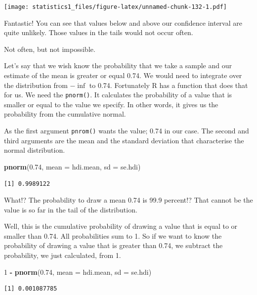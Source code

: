 \documentclass[]{book}
\newenvironment{Shaded}{\begin{snugshade}}{\end{snugshade}}
\newcommand{\KeywordTok}[1]{\textcolor[rgb]{0.13,0.29,0.53}{\textbf{#1}}}
\newcommand{\DataTypeTok}[1]{\textcolor[rgb]{0.13,0.29,0.53}{#1}}
\newcommand{\DecValTok}[1]{\textcolor[rgb]{0.00,0.00,0.81}{#1}}
\newcommand{\FloatTok}[1]{\textcolor[rgb]{0.00,0.00,0.81}{#1}}
\newcommand{\StringTok}[1]{\textcolor[rgb]{0.31,0.60,0.02}{#1}}
\newcommand{\OperatorTok}[1]{\textcolor[rgb]{0.81,0.36,0.00}{\textbf{#1}}}
\newcommand{\NormalTok}[1]{#1}
\theoremstyle{definition}
\theoremstyle{definition}
\theoremstyle{definition}
\theoremstyle{remark}
\begin{document}
\texttt{[image: statistics1\_files/figure-latex/unnamed-chunk-132-1.pdf]}

Fantastic! You can see that values below and above our confidence
interval are quite unlikely. Those values in the tails would not occur
often.

Not often, but not impossible.

Let's say that we wish know the probability that we take a sample and
our estimate of the mean is greater or equal 0.74. We would need to
integrate over the distribution from \(-\inf\) to 0.74. Fortunately R
has a function that does that for us. We need the \texttt{pnorm()}. It
calculates the probability of a value that is smaller or equal to the
value we specify. In other words, it gives us the probability from the
cumulative normal.

As the first argument \texttt{pnrom()} wants the value; 0.74 in our
case. The second and third arguments are the mean and the standard
deviation that characterise the normal distribution.

\begin{Shaded}
\begin{Highlighting}[]
\KeywordTok{pnorm}\NormalTok{(}\FloatTok{0.74}\NormalTok{, }\DataTypeTok{mean =}\NormalTok{ hdi.mean, }\DataTypeTok{sd =}\NormalTok{ se.hdi)}
\end{Highlighting}
\end{Shaded}

\begin{verbatim}
[1] 0.9989122
\end{verbatim}

What!? The probability to draw a mean 0.74 is 99.9 percent!? That cannot
be the value is so far in the tail of the distribution.

Well, this is the cumulative probability of drawing a value that is
equal to or smaller than 0.74. All probabilities sum to 1. So if we want
to know the probability of drawing a value that is greater than 0.74, we
subtract the probability, we just calculated, from 1.

\begin{Shaded}
\begin{Highlighting}[]
\DecValTok{1} \OperatorTok{-}\StringTok{ }\KeywordTok{pnorm}\NormalTok{(}\FloatTok{0.74}\NormalTok{, }\DataTypeTok{mean =}\NormalTok{ hdi.mean, }\DataTypeTok{sd =}\NormalTok{ se.hdi)}
\end{Highlighting}
\end{Shaded}

\begin{verbatim}
[1] 0.001087785
\end{verbatim}
\end{document}
